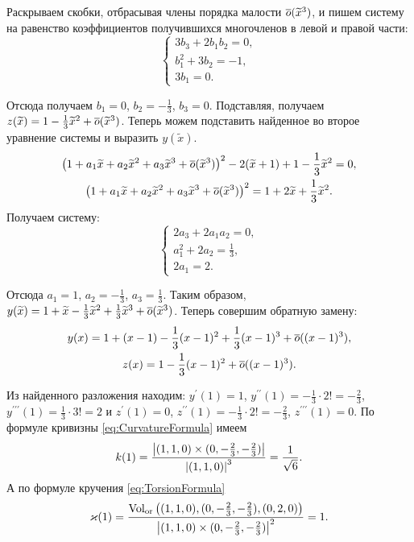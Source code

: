 \begin{solution}
	Раскрываем скобки, отбрасывая члены порядка малости $\overline{o}(\widetilde{x}^3)$, и пишем систему на равенство коэффициентов получившихся многочленов в левой и правой части:
	\[
		\begin{cases}
			3b_3 + 2b_1b_2 = 0,\\
			b_1^2 + 3b_2 = -1,\\
			3b_1 = 0.
		\end{cases}
	\]

	Отсюда получаем $b_1 = 0$, $b_2 = -\frac{1}{3}$, $b_3 = 0$. Подставляя, получаем $z(\widetilde{x}) = 1 - \frac{1}{3}\widetilde{x}^2 + \overline{o}(\widetilde{x}^3)$. Теперь можем подставить найденное во второе уравнение системы и выразить $y(\widetilde{x})$.
	\begin{gather*}
		\left(1 + a_1\widetilde{x} + a_2\widetilde{x}^2 + a_3\widetilde{x}^3 + \overline{o}(\widetilde{x}^3)\right)^2 - 2(\widetilde{x} + 1) + 1 - \frac{1}{3}\widetilde{x}^2 = 0,\\
		\left(1 + a_1\widetilde{x} + a_2\widetilde{x}^2 + a_3\widetilde{x}^3 + \overline{o}(\widetilde{x}^3)\right)^2 = 1 + 2\widetilde{x} + \frac{1}{3}\widetilde{x}^2.
	\end{gather*}
	Получаем систему:
	\[
		\begin{cases}
			2a_3 + 2a_1a_2 = 0,\\
			a_1^2 + 2a_2 = \frac{1}{3},\\
			2a_1 = 2.
		\end{cases}
	\]

	Отсюда $a_1 = 1$, $a_2 = -\frac{1}{3}$, $a_3 = \frac{1}{3}$. Таким образом, $y(\widetilde{x}) = 1 + \widetilde{x} - \frac{1}{3}\widetilde{x}^2 + \frac{1}{3}\widetilde{x}^3 + \overline{o}(\widetilde{x}^3)$. Теперь совершим обратную замену:
	\begin{gather*}
		y(x) = 1 + (x - 1) - \frac{1}{3}(x - 1)^2 + \frac{1}{3}(x - 1)^3 + \overline{o}((x - 1)^3),\\
		z(x) = 1 - \frac{1}{3}(x - 1)^2 + \overline{o}((x - 1)^3).
	\end{gather*}
	
	Из найденного разложения находим: $y^\prime(1) = 1$, $y^{\prime\prime}(1) = -\frac{1}{3} \cdot 2! = -\frac{2}{3}$, $y^{\prime\prime\prime}(1) = \frac{1}{3} \cdot 3! = 2$ и $z^\prime(1) = 0$, $z^{\prime\prime}(1) = -\frac{1}{3} \cdot 2! = -\frac{2}{3}$, $z^{\prime\prime\prime}(1) = 0$. По формуле кривизны \eqref{eq:CurvatureFormula} имеем
	\[
		k(1) = \frac{\left\lvert(1, 1, 0) \times (0, -\frac{2}{3}, -\frac{2}{3})\right\rvert}{\left\lvert(1, 1, 0)\right\rvert^3} = \frac{1}{\sqrt{6}}.
	\]
	А по формуле кручения \eqref{eq:TorsionFormula}
	\[
		\varkappa(1) = \frac{\operatorname{Vol}_{\mathrm{or}}\left((1, 1, 0), (0, -\frac{2}{3}, -\frac{2}{3}), (0, 2, 0)\right)}{\left\lvert(1, 1, 0) \times (0, -\frac{2}{3}, -\frac{2}{3})\right\rvert^2} = 1.
	\]
\end{solution}

